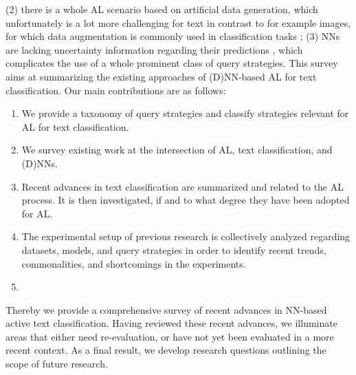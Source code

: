 (2) there is a whole AL scenario based on artificial data generation, which unfortunately is a lot more challenging for text in contrast to for example images, for which data augmentation is commonly used in classification tasks ;
(3) NNs are lacking uncertainty information regarding their predictions , which complicates the use of a whole prominent class of query strategies.
This survey aims at summarizing the existing approaches of (D)NN-based AL for text classification.
Our main contributions are as follows:
\begin{enumerate}
  \item We provide a taxonomy of query strategies and classify strategies relevant for AL for text classification.
  \item We survey existing work at the intersection of AL, text classification, and (D)NNs.
  \item Recent advances in text classification are summarized and related to the AL process. It is then investigated, if and to what degree they have been adopted for AL.
  \item The experimental setup of previous research is collectively analyzed regarding datasets, models, and query strategies in order to identify recent trends, commonalities, and shortcomings in the experiments.
  \item {}
\end{enumerate}
\noindent Thereby we provide a comprehensive survey of recent advances in NN-based active text classification. 
Having reviewed these recent advances, we illuminate areas that either need re-evaluation, or have not yet been evaluated in a more recent context.
As a final result, we develop research questions outlining the scope of future research.


